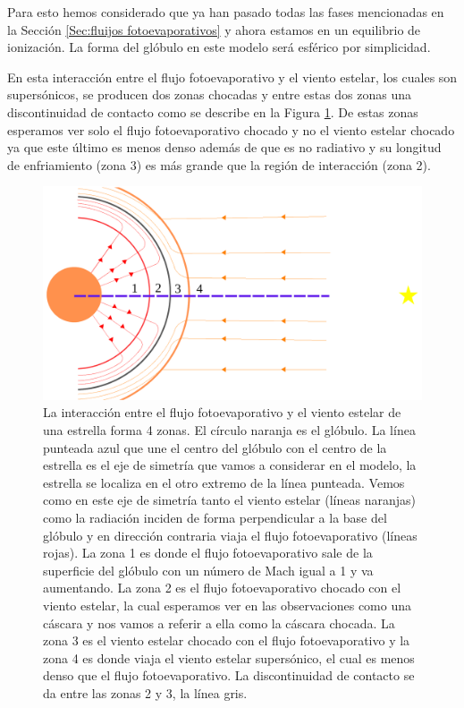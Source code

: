 \documentclass{book}
\begin{document}
Para esto hemos considerado que ya han pasado todas las fases
mencionadas en la Sección \ref{Sec:fluijos fotoevaporativos} y ahora
estamos en un equilibrio de ionización. La forma del glóbulo en este
modelo será esférico por simplicidad.

En esta interacción entre el flujo fotoevaporativo y el viento
estelar, los cuales son supersónicos, se producen dos zonas chocadas y
entre estas dos zonas una discontinuidad de contacto como se describe
en la Figura \ref{fig:zones}. De estas zonas esperamos ver solo el
flujo fotoevaporativo chocado y no el viento estelar chocado ya que
este último es menos denso además de que es no radiativo y su longitud
de enfriamiento (zona 3) es más grande que la región de interacción
(zona 2).

\begin{figure}[htb]
    \centering    \includegraphics[width=\textwidth]{imagenes_corregidas/Arreglo 01.pdf}
    \caption{La interacción entre el flujo fotoevaporativo y el viento
      estelar de una estrella forma 4 zonas. El círculo naranja es el
      glóbulo. La línea punteada azul que une el centro del glóbulo
      con el centro de la estrella es el eje de simetría que vamos a
      considerar en el modelo, la estrella se localiza en el otro
      extremo de la línea punteada. Vemos como en este eje de simetría
      tanto el viento estelar (líneas naranjas) como la radiación
      inciden de forma perpendicular a la base del glóbulo y en
      dirección contraria viaja el flujo fotoevaporativo (líneas
      rojas). La zona 1 es donde el flujo fotoevaporativo sale de la
      superficie del glóbulo con un número de Mach igual a 1 y va
      aumentando. La zona 2 es el flujo fotoevaporativo chocado con el
      viento estelar, la cual esperamos ver en las observaciones como
      una cáscara y nos vamos a referir a ella como la cáscara
      chocada. La zona 3 es el viento estelar chocado con el flujo
      fotoevaporativo y la zona 4 es donde viaja el viento estelar
      supersónico, el cual es menos denso que el flujo
      fotoevaporativo. La discontinuidad de contacto se da entre las
      zonas 2 y 3, la línea gris.}
    \label{fig:zones}
\end{figure}
\end{document}
